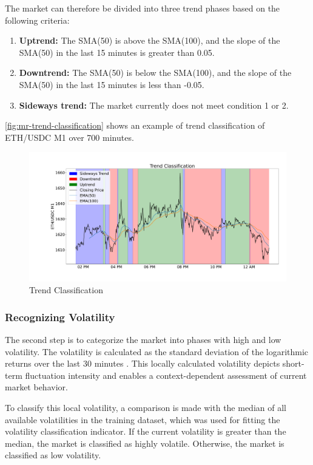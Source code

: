 The market can therefore be divided into three trend phases based on the following criteria:

\begin{enumerate}
    \item \textbf{Uptrend:} The SMA(50) is above the SMA(100), and the slope of the SMA(50) in the last 15 minutes is greater than 0.05.
    \item \textbf{Downtrend:} The SMA(50) is below the SMA(100), and the slope of the SMA(50) in the last 15 minutes is less than -0.05.
    \item \textbf{Sideways trend:} The market currently does not meet condition 1 or 2.
\end{enumerate}

\noindent
\autoref{fig:mr-trend-classification} shows an example of trend classification of ETH/USDC M1 over 700 minutes.

\begin{figure}[H]
    \centering
    \includegraphics[width=\textwidth]{images/market-regime/market_regime_trend}
    \caption{Trend Classification}
    \label{fig:mr-trend-classification}
\end{figure}

\subsubsection{Recognizing Volatility}
\label{chap:recognizing-vola}

The second step is to categorize the market into phases with high and low volatility.
The volatility is calculated as the standard deviation of the logarithmic returns over the last 30 minutes \cite{wiki-vola}.
This locally calculated volatility depicts short-term fluctuation intensity and enables a context-dependent assessment of current market behavior.

To classify this local volatility, a comparison is made with the median of all available volatilities in the training dataset, which was used for fitting the volatility classification indicator.
If the current volatility is greater than the median, the market is classified as highly volatile.
Otherwise, the market is classified as low volatility.

